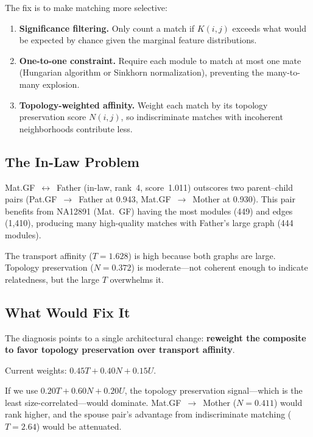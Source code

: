 \documentclass{../yalumba}
\begin{document}
The fix is to make matching more selective:

\begin{enumerate}
  \item \textbf{Significance filtering.}  Only count a match if $K(i,j)$
    exceeds what would be expected by chance given the marginal feature
    distributions.
  \item \textbf{One-to-one constraint.}  Require each module to match at
    most one mate (Hungarian algorithm or Sinkhorn normalization), preventing
    the many-to-many explosion.
  \item \textbf{Topology-weighted affinity.}  Weight each match by its
    topology preservation score $N(i,j)$, so indiscriminate matches with
    incoherent neighborhoods contribute less.
\end{enumerate}

\subsection{The In-Law Problem}

Mat.GF~$\leftrightarrow$~Father (in-law, rank~4, score~1.011) outscores two
parent--child pairs (Pat.GF~$\to$~Father at 0.943, Mat.GF~$\to$~Mother
at 0.930).  This pair benefits from NA12891 (Mat.~GF) having the most modules
(449) and edges (1{,}410), producing many high-quality matches with
Father's large graph (444 modules).

The transport affinity ($T = 1.628$) is high because both graphs are large.
Topology preservation ($N = 0.372$) is moderate---not coherent enough to
indicate relatedness, but the large $T$ overwhelms it.

\subsection{What Would Fix It}

The diagnosis points to a single architectural change: \textbf{reweight the
composite to favor topology preservation over transport affinity}.

Current weights: $0.45T + 0.40N + 0.15U$.

If we use $0.20T + 0.60N + 0.20U$, the topology preservation signal---which
is the least size-correlated---would dominate.  Mat.GF~$\to$~Mother
($N = 0.411$) would rank higher, and the spouse pair's advantage from
indiscriminate matching ($T = 2.64$) would be attenuated.


\end{document}
